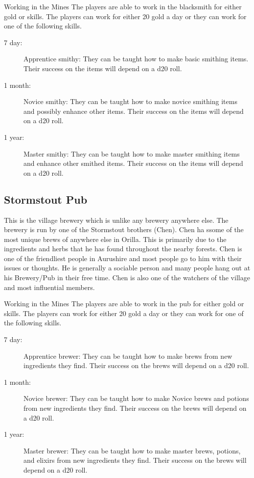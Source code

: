 \begin{commentbox}{Working in the Mines}
	The players are able to work in the blacksmith for either gold or skills. The players can work for either 20 gold a day or they can work for one of the following skills.
	\begin{description}
		\item[7 day:] Apprentice smithy: They can be taught how to make basic smithing items. Their success on the items will depend on a d20 roll.
		\item[1 month:] Novice smithy: They can be taught how to make novice smithing items and possibly enhance other items. Their success on the items will depend on a d20 roll.
		\item[1 year:] Master smithy: They can be taught how to make master smithing items and enhance other smithed items. Their success on the items will depend on a d20 roll.
	\end{description}
\end{commentbox}

\subsection{Stormstout Pub}

This is the village brewery which is unlike any brewery anywhere else. The brewery is run by one of the Stormstout brothers (Chen). Chen ha ssome of the most unique brews of anywhere else in Orilla. This is primarily due to the ingredients and herbs that he has found throughout the nearby forests. Chen is one of the friendliest people in Aurushire and most people go to him with their issues or thoughts. He is generally a sociable person and many people hang out at his Brewery/Pub in their free time. Chen is also one of the watchers of the village and most influential members.

\begin{commentbox}{Working in the Mines}
	The players are able to work in the pub for either gold or skills. The players can work for either 20 gold a day or they can work for one of the following skills.
	\begin{description}
		\item[7 day:] Apprentice brewer: They can be taught how to make brews from new ingredients they find. Their success on the brews will depend on a d20 roll.
		\item[1 month:] Novice brewer: They can be taught how to make Novice brews and potions from new ingredients they find. Their success on the brews will depend on a d20 roll.
		\item[1 year:] Master brewer: They can be taught how to make master brews, potions, and elixirs from new ingredients they find. Their success on the brews will depend on a d20 roll.
	\end{description}
\end{commentbox}

